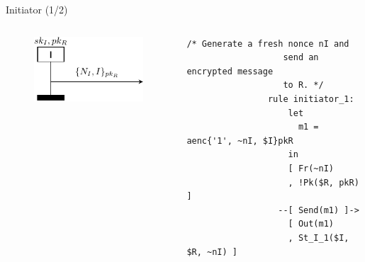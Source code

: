 \documentclass[11pt,aspectratio=169]{beamer}
\begin{document}
\begin{frame}[fragile]{Initiator (1/2)}
    \begin{columns}
        \begin{column}{0.5\textwidth}
            \begin{figure}
                \includegraphics[width=.8\textwidth]
                    {./figures/lecture_3/nspk_i1}
            \end{figure}
        \end{column}
        \begin{column}{0.5\textwidth}
            \begin{lstlisting}[style=tamarin, gobble=16]
                /* Generate a fresh nonce nI and
                   send an encrypted message
                   to R. */
                rule initiator_1:
                    let
                      m1 = aenc{'1', ~nI, $I}pkR
                    in
                    [ Fr(~nI)
                    , !Pk($R, pkR) ]
                  --[ Send(m1) ]->
                    [ Out(m1)
                    , St_I_1($I, $R, ~nI) ]
            \end{lstlisting}
        \end{column}
    \end{columns}
    \vsep
\end{frame}
\end{document}
